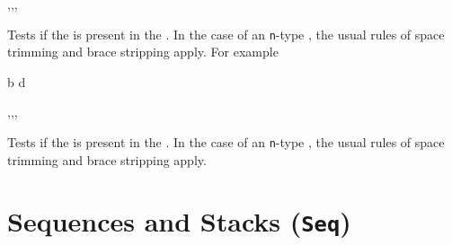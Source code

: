 \documentclass[oneside]{book}
\begin{document}
\begin{function}{\clistIfIn,\clistIfInT,\clistIfInF,\clistIfInTF}
\begin{syntax}
  
   
   
    
\end{syntax}
Tests if the  is present in the .
In the case of an \texttt{n}-type , the usual rules
of space trimming and brace stripping apply. For example
\begin{demohigh}
 {b} {} {}
 {d} {} {}
\end{demohigh}
\end{function}

\begin{function}{\clistVarIfIn,\clistVarIfInT,\clistVarIfInF,\clistVarIfInTF}
\begin{syntax}
  
   
   
    
\end{syntax}
Tests if the  is present in the .
In the case of an \texttt{n}-type , the usual rules
of space trimming and brace stripping apply.
\begin{demohigh}
\clistSet {}
\clistVarIfInTF {} {} {}
\clistVarIfInTF {} {} {}
\end{demohigh}
\end{function}

\chapter{Sequences and Stacks (\texttt{Seq})}
\end{document}
